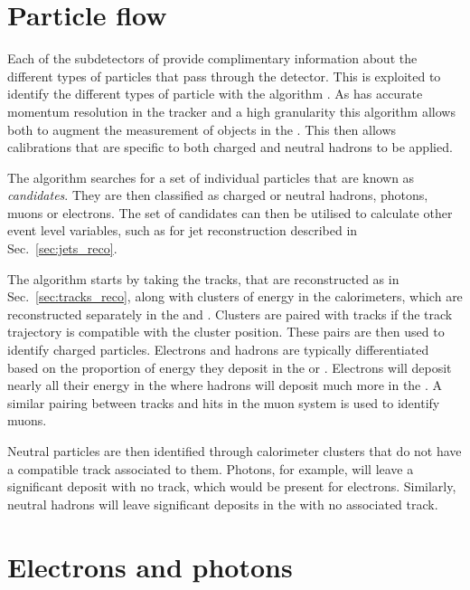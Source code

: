 \section{Particle flow}
\label{sec:pflow_reco}

Each of the subdetectors of \CMS provide complimentary information
about the different types of particles that pass through the detector.
This is exploited to identify the different types of particle with the
\PF algorithm
\cite{CMS-PAS-PFT-09-001,CMS-PAS-PFT-10-001,CMS-PAS-PFT-10-002}. As
\CMS has accurate momentum resolution in the tracker and a high
granularity \ECAL this algorithm allows both to augment the
measurement of objects in the \HCAL. This then allows calibrations
that are specific to both charged and neutral hadrons to be applied. 

The \PF algorithm searches for a set of individual particles that are
known as \PF \emph{candidates}. They are then classified as charged or
neutral hadrons, photons, muons or electrons. The set of \PF
candidates can then be utilised to calculate other event level
variables, such as for jet reconstruction described in
Sec.~\ref{sec:jets_reco}.

The algorithm starts by taking the tracks, that are reconstructed as
in Sec.~\ref{sec:tracks_reco}, along with clusters of energy
in the calorimeters, which are reconstructed separately in the \ECAL and
\HCAL. Clusters are paired with tracks if the track trajectory is
compatible with the cluster position. These pairs are then used to
identify charged particles. Electrons and hadrons are typically
differentiated based on the proportion of energy they deposit in the
\ECAL or \HCAL. Electrons will deposit nearly all their energy in the
\ECAL where hadrons will deposit much more in the \HCAL. A similar
pairing between tracks and hits in the muon system is used to identify
muons. 

Neutral particles are then identified through calorimeter clusters
that do not have a compatible track associated to them. Photons, for
example, will leave a significant \ECAL deposit with no track, which
would be present for electrons. Similarly, neutral hadrons will leave
significant deposits in the \HCAL with no associated track.

\section{Electrons and photons}
\label{sec:electrons_reco}

